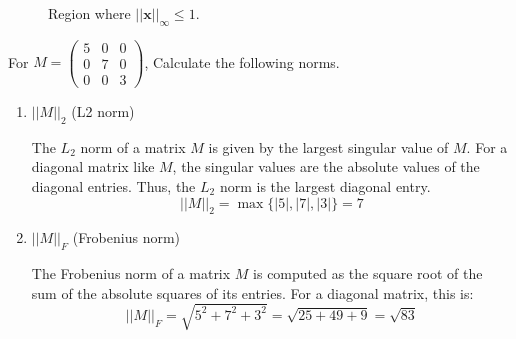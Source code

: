 \documentclass[letter]{article}
\theoremstyle{definition}
\newenvironment{soln}{
	\leavevmode\color{black}\ignorespaces
}{}
\begin{document}
\begin{enumerate}
\begin{soln}
                    \begin{figure}[h!]
                        \centering
                        \caption{Region where $||\mathbf{x}||_\infty \leq 1$.}
                        \label{fig:norminfinity}
                    \end{figure}
                \end{soln}
	\end{enumerate}
	
	For $M = \begin{pmatrix}
		5 & 0 & 0 \\ 0 & 7 & 0 \\ 0 & 0 & 3
		
	\end{pmatrix}$, Calculate the following norms.
	\begin{enumerate}\addtocounter{enumi}{3}
		\item $||M||_{2}$ (L2 norm) \\
		
            \begin{soln}
                The $L_2$ norm of a matrix $M$ is given by the largest singular value of $M$. For a diagonal matrix like $M$, the singular values are the absolute values of the diagonal entries. Thus, the $L_2$ norm is the largest diagonal entry.
                \[
                ||M||_{2} = \max \{ |5|, |7|, |3| \} = 7
                \]
            \end{soln}
		
		\item $||M||_{F}$ (Frobenius norm)\\
		  
            \begin{soln}
                The Frobenius norm of a matrix $M$ is computed as the square root of the sum of the absolute squares of its entries. For a diagonal matrix, this is:
                \[
                ||M||_{F} = \sqrt{5^2 + 7^2 + 3^2} = \sqrt{25 + 49 + 9} = \sqrt{83}
                \]
            \end{soln}
		
		
	\end{enumerate}
	
\end{document}
